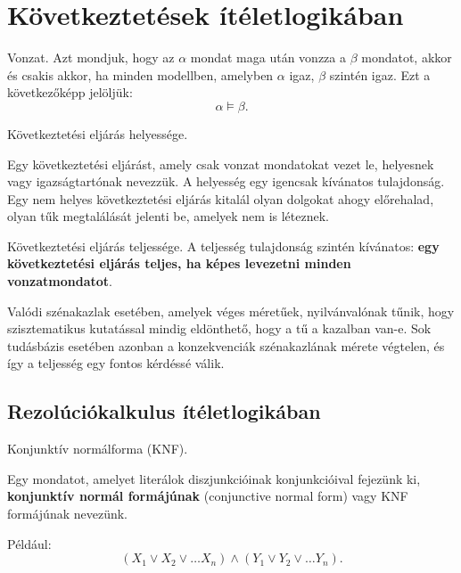 \section{Következtetések ítéletlogikában}


\begin{definicio}
    Vonzat.
    Azt mondjuk, hogy az $\alpha$ mondat maga után vonzza a  $\beta$ mondatot,
    akkor és csakis akkor, ha minden modellben, amelyben $\alpha$ igaz, $\beta$ szintén
    igaz. Ezt a következőképp jelöljük: \[
        \alpha \models \beta
    .\]
\end{definicio}

\begin{definicio}
    Következtetési eljárás helyessége.

    Egy következtetési eljárást, amely csak vonzat mondatokat vezet le,
    helyesnek vagy igazságtartónak nevezzük. A helyesség egy igencsak kívánatos
    tulajdonság. Egy nem helyes következtetési eljárás kitalál olyan dolgokat
    ahogy előrehalad, olyan tűk megtalálását jelenti be, amelyek nem is
    léteznek.
\end{definicio}

\begin{definicio}
    Következtetési eljárás teljessége.  A teljesség tulajdonság szintén
    kívánatos: {\bf egy következtetési eljárás teljes, ha képes levezetni
    minden vonzatmondatot}.

    Valódi szénakazlak esetében, amelyek véges méretűek, nyilvánvalónak tűnik,
    hogy szisztematikus kutatással mindig eldönthető, hogy a tű a kazalban
    van-e. Sok tudásbázis esetében azonban a konzekvenciák szénakazlának mérete
    végtelen, és így a teljesség egy fontos kérdéssé válik.
\end{definicio}

\subsection{Rezolúciókalkulus ítéletlogikában}

\begin{definicio}
    Konjunktív normálforma (KNF).

    Egy mondatot, amelyet literálok diszjunkcióinak konjunkcióival fejezünk ki,
    {\bf konjunktív normál formájúnak} (conjunctive normal form) vagy KNF
    formájúnak nevezünk.

    Például: \[
        (X_1 \lor X_2 \lor \ldots X_n) \land
        (Y_1 \lor Y_2 \lor \ldots Y_n)
    .\]
\end{definicio}

